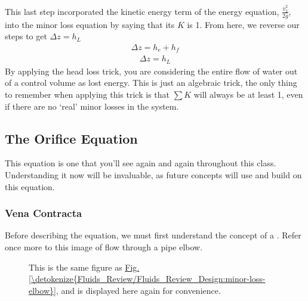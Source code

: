 \documentclass[letterpaper,10pt,english]{sphinxmanual}
\let\sphinxpxdimen\pdfpxdimen\else\newdimen\sphinxpxdimen
\begin{document}
This last step incorporated the kinetic energy term of the energy equation, \(\frac{\bar v_2^2}{2g}\), into the minor loss equation by saying that its \(K\) is 1. From here, we reverse our steps to get \(\Delta z = h_L\)
\begin{equation}\label{equation:Fluids_Review/Fluids_Review_Design:Fluids_Review/Fluids_Review_Design:26}
\begin{split}\Delta z = h_e + h_f\end{split}
\end{equation}\begin{equation}\label{equation:Fluids_Review/Fluids_Review_Design:Fluids_Review/Fluids_Review_Design:27}
\begin{split}\Delta z = h_L\end{split}
\end{equation}
By applying the head loss trick, you are considering the entire flow of water out of a control volume as lost energy. This is just an algebraic trick, the only thing to remember when applying this trick is that \(\sum K\) will always be at least 1, even if there are no ‘real’ minor losses in the system.


\subsection{The Orifice Equation}
\label{\detokenize{Fluids_Review/Fluids_Review_Design:the-orifice-equation}}\label{\detokenize{Fluids_Review/Fluids_Review_Design:id10}}
This equation is one that you’ll see again and again throughout this class. Understanding it now will be invaluable, as future concepts will use and build on this equation.


\subsubsection{Vena Contracta}
\label{\detokenize{Fluids_Review/Fluids_Review_Design:vena-contracta}}
Before describing the equation, we must first understand the concept of a . Refer once more to this image of flow through a pipe elbow.

\begin{figure}[htbp]
\centering
\capstart

\noindent\sphinxincludegraphics[width=650\sphinxpxdimen]{{minor_loss_elbow}.png}
\caption{This is the same figure as \hyperref[\detokenize{Fluids_Review/Fluids_Review_Design:minor-loss-elbow}]{Fig.\@ \ref{\detokenize{Fluids_Review/Fluids_Review_Design:minor-loss-elbow}}}, and is displayed here again for convenience.}\label{\detokenize{Fluids_Review/Fluids_Review_Design:id21}}\label{\detokenize{Fluids_Review/Fluids_Review_Design:minor-loss-elbow-2}}\end{figure}
\end{document}
